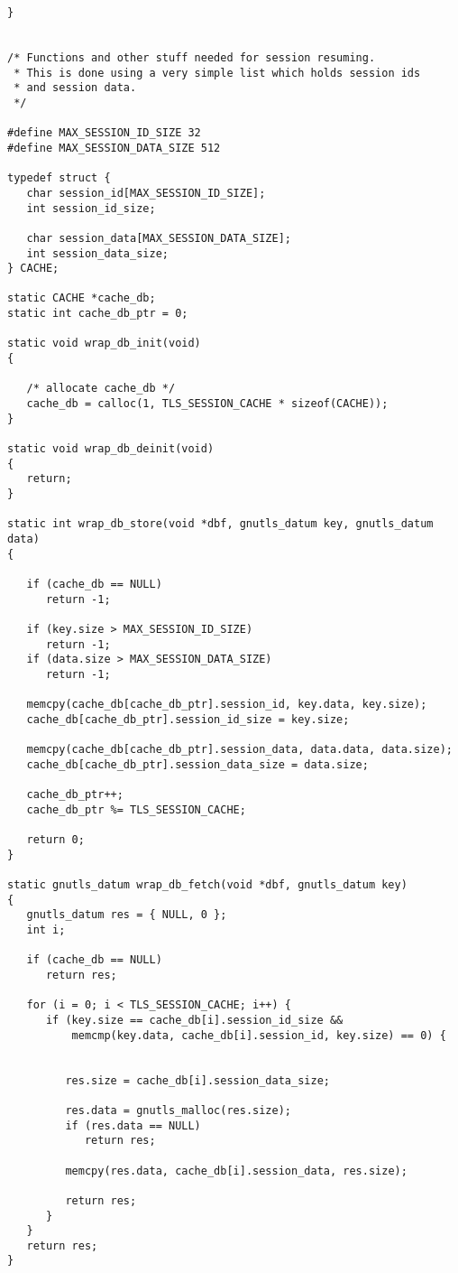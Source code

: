 \begin{verbatim}
}


/* Functions and other stuff needed for session resuming.
 * This is done using a very simple list which holds session ids
 * and session data.
 */

#define MAX_SESSION_ID_SIZE 32
#define MAX_SESSION_DATA_SIZE 512

typedef struct {
   char session_id[MAX_SESSION_ID_SIZE];
   int session_id_size;

   char session_data[MAX_SESSION_DATA_SIZE];
   int session_data_size;
} CACHE;

static CACHE *cache_db;
static int cache_db_ptr = 0;

static void wrap_db_init(void)
{

   /* allocate cache_db */
   cache_db = calloc(1, TLS_SESSION_CACHE * sizeof(CACHE));
}

static void wrap_db_deinit(void)
{
   return;
}

static int wrap_db_store(void *dbf, gnutls_datum key, gnutls_datum data)
{

   if (cache_db == NULL)
      return -1;

   if (key.size > MAX_SESSION_ID_SIZE)
      return -1;
   if (data.size > MAX_SESSION_DATA_SIZE)
      return -1;

   memcpy(cache_db[cache_db_ptr].session_id, key.data, key.size);
   cache_db[cache_db_ptr].session_id_size = key.size;

   memcpy(cache_db[cache_db_ptr].session_data, data.data, data.size);
   cache_db[cache_db_ptr].session_data_size = data.size;

   cache_db_ptr++;
   cache_db_ptr %= TLS_SESSION_CACHE;

   return 0;
}

static gnutls_datum wrap_db_fetch(void *dbf, gnutls_datum key)
{
   gnutls_datum res = { NULL, 0 };
   int i;

   if (cache_db == NULL)
      return res;

   for (i = 0; i < TLS_SESSION_CACHE; i++) {
      if (key.size == cache_db[i].session_id_size &&
          memcmp(key.data, cache_db[i].session_id, key.size) == 0) {


         res.size = cache_db[i].session_data_size;

         res.data = gnutls_malloc(res.size);
         if (res.data == NULL)
            return res;

         memcpy(res.data, cache_db[i].session_data, res.size);

         return res;
      }
   }
   return res;
}


\end{verbatim}
